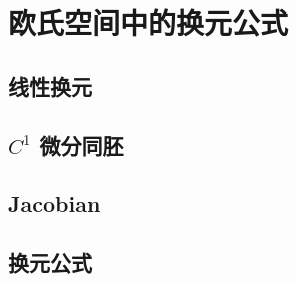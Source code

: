 \section{欧氏空间中的换元公式}
\label{b1:sec:0705}


\subsection{线性换元}
\label{b1:subsec:070501}

\subsection{\texorpdfstring{\(C^1\)}{C1} 微分同胚}
\label{b1:subsec:070502}

\subsection{Jacobian}
\label{b1:subsec:070503}

\subsection{换元公式}
\label{b1:subsec:070504}


